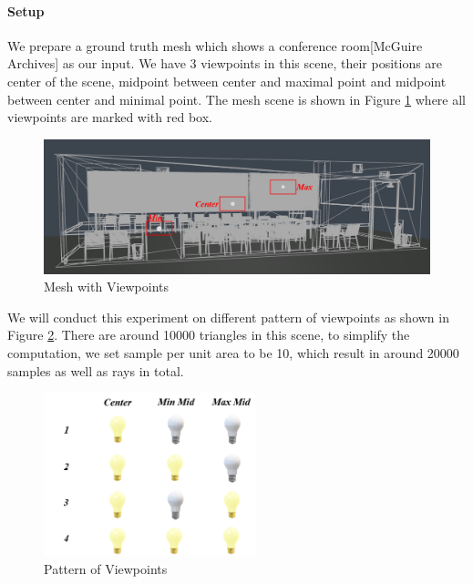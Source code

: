 \documentclass[11pt, a4paper,oneside,chapterprefix=false]{scrbook}
\begin{document}
\paragraph{Setup}

We prepare a ground truth mesh which shows a conference room[McGuire Archives] as our input. We have 3 viewpoints in this scene, their positions are center of the scene, midpoint between center and maximal point and midpoint between center and minimal point. The mesh scene is shown in Figure \ref{fig:mesh with viewpoints} where all viewpoints are marked with red box. 

\begin{figure}[H]
    \centering
    \includegraphics*[width=1.0\textwidth]{figures/mesh with vps.png}
    \caption{Mesh with Viewpoints}
    \label{fig:mesh with viewpoints}
\end{figure}

We will conduct this experiment on different pattern of viewpoints as shown in Figure \ref{fig:pattern of viewpoints}. 
There are around 10000 triangles in this scene, to simplify the computation, we set sample per unit area to be 10, which result in around 20000 samples as well as rays in total. 

\begin{figure}[H]
    \centering
    \includegraphics*[width=0.55\textwidth]{figures/pattern of viewpoints.png}
    \caption{Pattern of Viewpoints}
    \label{fig:pattern of viewpoints}
\end{figure}
\end{document}

